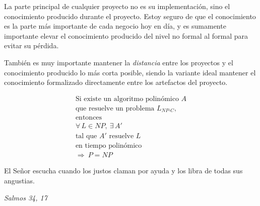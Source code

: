 \documentclass{claudeeditorial}
\begin{document}
\BodyCopy
\ClaudeCover


La parte principal de cualquier proyecto no es su implementación, sino el conocimiento producido durante el proyecto. Estoy seguro de que el conocimiento es la parte más importante de cada negocio hoy en día, y es sumamente importante elevar el conocimiento producido del nivel no formal al formal para evitar su pérdida.

También es muy importante mantener la \emph{distancia} entre los proyectos y el conocimiento producido lo más corta posible, siendo la variante ideal mantener el conocimiento formalizado directamente entre los artefactos del proyecto.


\begin{claudehero}
\begin{gather*}
\text{Si existe un algoritmo polinómico } A \\
\text{que resuelve un problema } L_{NP\text{-}C}, \\
\text{entonces} \\
\forall\, L \in NP,\ \exists\, A' \\
\text{tal que } A' \text{ resuelve } L \\
\text{en tiempo polinómico} \\[0.4em]
\Rightarrow\ P = NP
\end{gather*}
\end{claudehero}


\begin{claudequote}
El Señor escucha cuando los justos claman por ayuda y los libra de todas sus angustias.
\end{claudequote}

\hfill {\UIFont\small\itshape Salmos 34, 17}


\begin{claudehero}
\end{claudehero}
\end{document}
